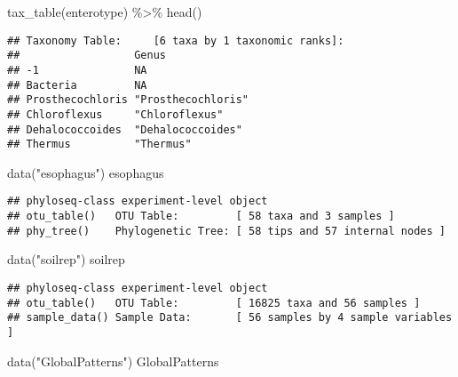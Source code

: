 \documentclass[
]{article}
\newenvironment{Shaded}{\begin{snugshade}}{\end{snugshade}}
\newcommand{\FunctionTok}[1]{\textcolor[rgb]{0.00,0.00,0.00}{#1}}
\newcommand{\NormalTok}[1]{#1}
\newcommand{\SpecialCharTok}[1]{\textcolor[rgb]{0.00,0.00,0.00}{#1}}
\newcommand{\StringTok}[1]{\textcolor[rgb]{0.31,0.60,0.02}{#1}}
\begin{document}
\begin{Shaded}
\begin{Highlighting}[]
\FunctionTok{tax\_table}\NormalTok{(enterotype) }\SpecialCharTok{\%\textgreater{}\%} \FunctionTok{head}\NormalTok{()}
\end{Highlighting}
\end{Shaded}

\begin{verbatim}
## Taxonomy Table:     [6 taxa by 1 taxonomic ranks]:
##                  Genus             
## -1               NA                
## Bacteria         NA                
## Prosthecochloris "Prosthecochloris"
## Chloroflexus     "Chloroflexus"    
## Dehalococcoides  "Dehalococcoides" 
## Thermus          "Thermus"
\end{verbatim}

\begin{Shaded}
\begin{Highlighting}[]
\FunctionTok{data}\NormalTok{(}\StringTok{"esophagus"}\NormalTok{)}
\NormalTok{esophagus}
\end{Highlighting}
\end{Shaded}

\begin{verbatim}
## phyloseq-class experiment-level object
## otu_table()   OTU Table:         [ 58 taxa and 3 samples ]
## phy_tree()    Phylogenetic Tree: [ 58 tips and 57 internal nodes ]
\end{verbatim}

\begin{Shaded}
\begin{Highlighting}[]
\FunctionTok{data}\NormalTok{(}\StringTok{"soilrep"}\NormalTok{)}
\NormalTok{soilrep}
\end{Highlighting}
\end{Shaded}

\begin{verbatim}
## phyloseq-class experiment-level object
## otu_table()   OTU Table:         [ 16825 taxa and 56 samples ]
## sample_data() Sample Data:       [ 56 samples by 4 sample variables ]
\end{verbatim}

\begin{Shaded}
\begin{Highlighting}[]
\FunctionTok{data}\NormalTok{(}\StringTok{"GlobalPatterns"}\NormalTok{)}
\NormalTok{GlobalPatterns}
\end{Highlighting}
\end{Shaded}
\end{document}
